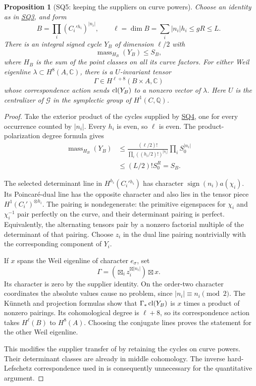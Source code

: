 \documentclass[11pt,a4paper]{article}
\newtheorem{proposition}[theorem]{Proposition}
\theoremstyle{definition}\newtheorem{definition}[theorem]{Definition}
\theoremstyle{remark}\newtheorem{remark}[theorem]{Remark}
\newcommand{\Q}{\mathbb Q}\newcommand{\Z}{\mathbb Z}\newcommand{\C}{\mathbb C}\newcommand{\R}{\mathbb R}
\newcommand{\findingref}[1]{\hyperref[#1]{\textsf{#1}}}
\begin{document}
\begin{proposition}[SQ5: keeping the suppliers on curve powers]\label{SQ5}
Choose an identity as in \findingref{SQ3}, and form
\[
 B=\prod_i(C_i'{}^{h_i})^{|n_i|},\qquad
 \ell=\dim B=\sum_i|n_i|h_i\le gR\le L.
\]
There is an integral signed cycle $Y_B$ of dimension $\ell/2$ with
\[
 \operatorname{mass}_{H_B}(Y_B)\le S_B,
\]
where $H_B$ is the sum of the point classes on all its curve factors. For either Weil eigenline $\lambda\subset H^8(A,\C)$, there is a $U$-invariant tensor
\[
 \Gamma\in H^{\ell+8}(B\times A,\C)
\]
whose correspondence action sends $\operatorname{cl}(Y_B)$ to a nonzero vector of $\lambda$. Here $U$ is the centralizer of $\mathcal G$ in the symplectic group of $H^1(C,\Q)$.
\end{proposition}
\begin{proof}
Take the exterior product of the cycles supplied by \findingref{SQ4}, one for every occurrence counted by $|n_i|$. Every $h_i$ is even, so $\ell$ is even. The product-polarization degree formula gives
\begin{align*}
 \operatorname{mass}_{H_B}(Y_B)
 &\le\frac{(\ell/2)!}{\prod_i((h_i/2)!)^{|n_i|}}
       \prod_iS_0^{|n_i|}\\
 &\le(L/2)!S_0^R=S_B.
\end{align*}

The selected determinant line in $H^{h_i}(C_i'{}^{h_i})$ has character $\operatorname{sign}(n_i)a(\chi_i)$. Its Poincar\'e-dual line has the opposite character and also lies in the tensor piece $H^1(C_i')^{\otimes h_i}$. The pairing is nondegenerate: the primitive eigenspaces for $\chi_i$ and $\chi_i^{-1}$ pair perfectly on the curve, and their determinant pairing is perfect. Equivalently, the alternating tensors pair by a nonzero factorial multiple of the determinant of that pairing. Choose $z_i$ in the dual line pairing nontrivially with the corresponding component of $Y_i$.

If $x$ spans the Weil eigenline of character $e_\sigma$, set
\[
 \Gamma=\left(\mathop{\boxtimes}_i
                   z_i^{\boxtimes|n_i|}\right)\boxtimes x.
\]
Its character is zero by the supplier identity. On the order-two character coordinates the absolute values cause no problem, since $|n_i|\equiv n_i\pmod2$. The K\"unneth and projection formulas show that $\Gamma_*\operatorname{cl}(Y_B)$ is $x$ times a product of nonzero pairings. Its cohomological degree is $\ell+8$, so its correspondence action takes $H^\ell(B)$ to $H^8(A)$. Choosing the conjugate lines proves the statement for the other Weil eigenline.

This modifies the supplier transfer of \citet[Proposition \texttt{prop:supply}]{Severn26} by retaining the cycles on curve powers. Their determinant classes are already in middle cohomology. The inverse hard-Lefschetz correspondence used in \citet[Corollary~3.1, p.~25]{Schoen88} is consequently unnecessary for the quantitative argument.
\end{proof}
\end{document}
